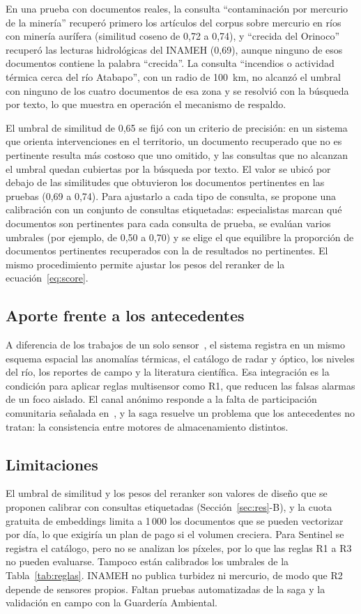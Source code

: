 \documentclass[conference]{IEEEtran}
\begin{document}
En una prueba con documentos reales, la consulta ``contaminación por mercurio de la minería'' recuperó primero los artículos del corpus sobre mercurio en ríos con minería aurífera (similitud coseno de 0,72 a 0,74), y ``crecida del Orinoco'' recuperó las lecturas hidrológicas del INAMEH (0,69), aunque ninguno de esos documentos contiene la palabra ``crecida''. La consulta ``incendios o actividad térmica cerca del río Atabapo'', con un radio de 100~km, no alcanzó el umbral con ninguno de los cuatro documentos de esa zona y se resolvió con la búsqueda por texto, lo que muestra en operación el mecanismo de respaldo.

El umbral de similitud de 0,65 se fijó con un criterio de precisión: en un sistema que orienta intervenciones en el territorio, un documento recuperado que no es pertinente resulta más costoso que uno omitido, y las consultas que no alcanzan el umbral quedan cubiertas por la búsqueda por texto. El valor se ubicó por debajo de las similitudes que obtuvieron los documentos pertinentes en las pruebas (0,69 a 0,74). Para ajustarlo a cada tipo de consulta, se propone una calibración con un conjunto de consultas etiquetadas: especialistas marcan qué documentos son pertinentes para cada consulta de prueba, se evalúan varios umbrales (por ejemplo, de 0,50 a 0,70) y se elige el que equilibre la proporción de documentos pertinentes recuperados con la de resultados no pertinentes. El mismo procedimiento permite ajustar los pesos del reranker de la ecuación~\eqref{eq:score}.


\subsection{Aporte frente a los antecedentes}
A diferencia de los trabajos de un solo sensor~\cite{camalan2022,pereira2024,caballero2018}, el sistema registra en un mismo esquema espacial las anomalías térmicas, el catálogo de radar y óptico, los niveles del río, los reportes de campo y la literatura científica. Esa integración es la condición para aplicar reglas multisensor como R1, que reducen las falsas alarmas de un foco aislado. El canal anónimo responde a la falta de participación comunitaria señalada en~\cite{siqueira2021}, y la saga resuelve un problema que los antecedentes no tratan: la consistencia entre motores de almacenamiento distintos.

\subsection{Limitaciones}
El umbral de similitud y los pesos del reranker son valores de diseño que se proponen calibrar con consultas etiquetadas (Sección~\ref{sec:res}-B), y la cuota gratuita de embeddings limita a 1\,000 los documentos que se pueden vectorizar por día, lo que exigiría un plan de pago si el volumen creciera. Para Sentinel se registra el catálogo, pero no se analizan los píxeles, por lo que las reglas R1 a R3 no pueden evaluarse. Tampoco están calibrados los umbrales de la Tabla~\ref{tab:reglas}. INAMEH no publica turbidez ni mercurio, de modo que R2 depende de sensores propios. Faltan pruebas automatizadas de la saga y la validación en campo con la Guardería Ambiental.
\end{document}
